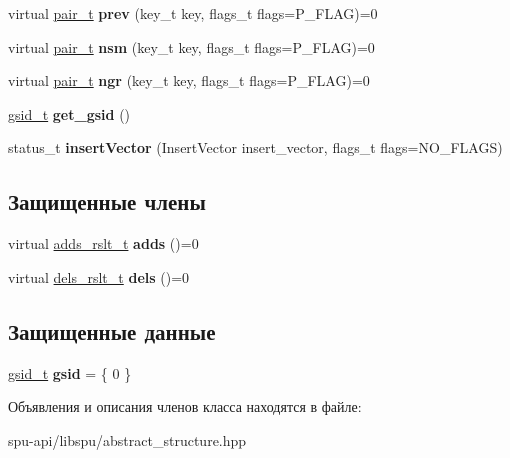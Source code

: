 \begin{DoxyCompactItemize}
virtual \hyperlink{struct_s_p_u_1_1pair__containter}{pair\+\_\+t} {\bfseries prev} (key\+\_\+t key, flags\+\_\+t flags=P\+\_\+\+F\+L\+AG)=0
\item 
\mbox{\label{class_s_p_u_1_1_abstract_structure_af4d912aaacd609f571c1e3125ca8c6bf}} 
virtual \hyperlink{struct_s_p_u_1_1pair__containter}{pair\+\_\+t} {\bfseries nsm} (key\+\_\+t key, flags\+\_\+t flags=P\+\_\+\+F\+L\+AG)=0
\item 
\mbox{\label{class_s_p_u_1_1_abstract_structure_af46e8bf350be4a504ba492bf3984568e}} 
virtual \hyperlink{struct_s_p_u_1_1pair__containter}{pair\+\_\+t} {\bfseries ngr} (key\+\_\+t key, flags\+\_\+t flags=P\+\_\+\+F\+L\+AG)=0
\item 
\mbox{\label{class_s_p_u_1_1_abstract_structure_af1f3aec8e4899b17744bbbbe7093050a}} 
\hyperlink{structgsid__container}{gsid\+\_\+t} {\bfseries get\+\_\+gsid} ()
\item 
\mbox{\label{class_s_p_u_1_1_abstract_structure_a98e992aa4e41aaa276d1b1ef54521e05}} 
status\+\_\+t {\bfseries insert\+Vector} (Insert\+Vector insert\+\_\+vector, flags\+\_\+t flags=N\+O\+\_\+\+F\+L\+A\+GS)
\end{DoxyCompactItemize}
\subsection*{Защищенные члены}
\begin{DoxyCompactItemize}
\item 
\mbox{\label{class_s_p_u_1_1_abstract_structure_a9b717355192df2a255bf4925f0c1f75b}} 
virtual \hyperlink{structrsltfrmt__0}{adds\+\_\+rslt\+\_\+t} {\bfseries adds} ()=0
\item 
\mbox{\label{class_s_p_u_1_1_abstract_structure_a818241d315d330a23dcfbed10630b4be}} 
virtual \hyperlink{structrsltfrmt__1}{dels\+\_\+rslt\+\_\+t} {\bfseries dels} ()=0
\end{DoxyCompactItemize}
\subsection*{Защищенные данные}
\begin{DoxyCompactItemize}
\item 
\mbox{\label{class_s_p_u_1_1_abstract_structure_a6c31f84ff4323aad1ebc3690ccc0d3cc}} 
\hyperlink{structgsid__container}{gsid\+\_\+t} {\bfseries gsid} = \{ 0 \}
\end{DoxyCompactItemize}


Объявления и описания членов класса находятся в файле\+:\begin{DoxyCompactItemize}
\item 
spu-\/api/libspu/abstract\+\_\+structure.\+hpp\end{DoxyCompactItemize}
